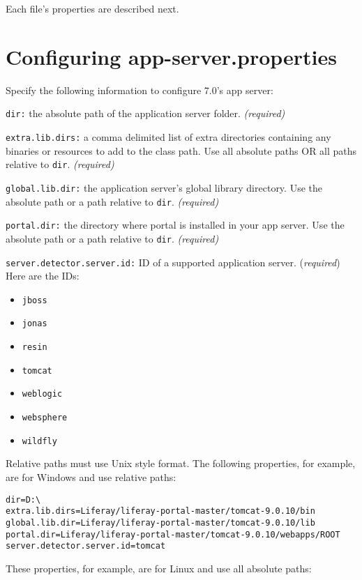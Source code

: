 Each file's properties are described next.

\section{Configuring
app-server.properties}\label{configuring-app-server.properties}

Specify the following information to configure 7.0's app server:

\texttt{dir:} the absolute path of the application server folder.
\emph{(required)}

\texttt{extra.lib.dirs:} a comma delimited list of extra directories
containing any binaries or resources to add to the class path. Use all
absolute paths OR all paths relative to \texttt{dir}. \emph{(required)}

\texttt{global.lib.dir:} the application server's global library
directory. Use the absolute path or a path relative to \texttt{dir}.
\emph{(required)}

\texttt{portal.dir:} the directory where portal is installed in your app
server. Use the absolute path or a path relative to \texttt{dir}.
\emph{(required)}

\texttt{server.detector.server.id:} ID of a supported application
server. (\emph{required}) Here are the IDs:

\begin{itemize}
\tightlist
\item
  \texttt{jboss}
\item
  \texttt{jonas}
\item
  \texttt{resin}
\item
  \texttt{tomcat}
\item
  \texttt{weblogic}
\item
  \texttt{websphere}
\item
  \texttt{wildfly}
\end{itemize}

Relative paths must use Unix style format. The following properties, for
example, are for Windows and use relative paths:

\begin{verbatim}
dir=D:\
extra.lib.dirs=Liferay/liferay-portal-master/tomcat-9.0.10/bin
global.lib.dir=Liferay/liferay-portal-master/tomcat-9.0.10/lib
portal.dir=Liferay/liferay-portal-master/tomcat-9.0.10/webapps/ROOT
server.detector.server.id=tomcat
\end{verbatim}

These properties, for example, are for Linux and use all absolute paths:


